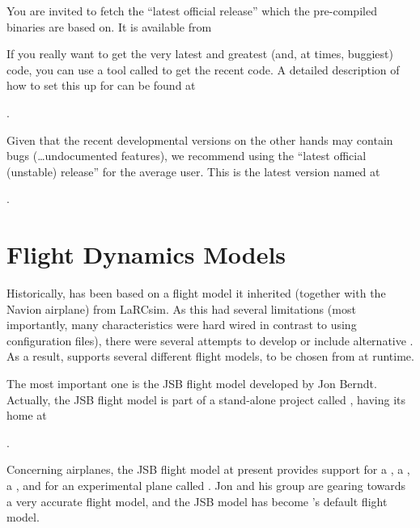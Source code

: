 You are invited to fetch the ``latest official release'' which the
pre-compiled binaries are based on.  It is available from
\medskip

\medskip

If you really want to get the very latest and greatest (and, at times,
buggiest) code, you can use a tool called 
to get the recent code. A detailed description of how to set this up for \FlightGear{}
can be found at
 \medskip

.
 \medskip

 \noindent
 Given that the recent developmental versions on the
 other hands may contain bugs (\ldots undocumented features), we recommend using the
 ``latest official (unstable) release'' for the average user. This is the latest version named at

 .

\section{Flight Dynamics Models\label{flightmodels}}
Historically, \FlightGear{} has been based on a flight model it inherited (together
with the Navion airplane) from LaRCsim. As this had several limitations (most importantly,
many characteristics were hard wired in contrast to using configuration files), there were
several attempts to develop or include alternative . As a result,
\FlightGear{} supports several different flight models, to be chosen from at runtime.

The most important one is the JSB flight model developed by Jon Berndt. Actually, the JSB
flight model is part of a stand-alone project called \JSBSim, having its home at
 \medskip

.
 \medskip

 \noindent
Concerning airplanes, the JSB flight model at present provides support for a
, a , a , and for an experimental plane
called . Jon and his group are gearing towards a very accurate flight model, and the
JSB model has become \FlightGear{}'s default flight model.

